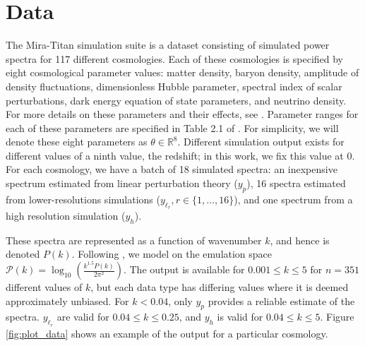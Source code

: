 \documentclass[11pt]{article}
\begin{document}


\section{Data}
\label{sec:data}

The Mira-Titan simulation suite is a dataset consisting of simulated power spectra for 
117 different cosmologies. Each of these cosmologies is specified by eight cosmological 
parameter values: matter density, baryon density, amplitude of density fluctuations, 
dimensionless Hubble parameter, spectral index of scalar perturbations,
dark energy equation of state parameters, and neutrino density. For more details 
on these parameters and their effects, see \cite{dodelson2020modern, aghanim2020planck, heitmann2016mira}. 
Parameter ranges for each of these parameters are specified in Table 2.1 of \cite{moran2023mira}.
For simplicity, we will denote these eight parameters as $\theta \in \mathbb{R}^8$. Different simulation 
output exists for different values of a ninth value, the redshift; in this work, we fix 
this value at 0. For each cosmology, we have a batch of 18 simulated spectra: an inexpensive 
spectrum estimated from linear perturbation theory ($y_p$), 16 spectra estimated from 
lower-resolutions simulations ($y_{\ell_r}, r \in \{1,\dots,16\}$), and one spectrum from 
a high resolution simulation ($y_h$). 

These spectra are represented as a function of wavenumber $k$, and hence is denoted $P(k)$. 
Following \cite{moran2023mira}, we model on the emulation space 
$\mathcal{P}(k)=\log_{10}\left(\frac{k^{1.5}P(k)}{2\pi^2}\right)$. The output is available 
for $0.001 \leq k \leq 5$ for $n=351$ different values of $k$, but each data type has differing 
values where it is deemed approximately unbiased. For $k<0.04$, only $y_p$ provides a reliable 
estimate of the spectra. $y_{\ell_r}$ are valid for $0.04 \leq k \leq 0.25$, and $y_h$ is valid 
for $0.04 \leq k \leq 5$. Figure \ref{fig:plot_data} shows an example of the output for a 
particular cosmology.
\end{document}
